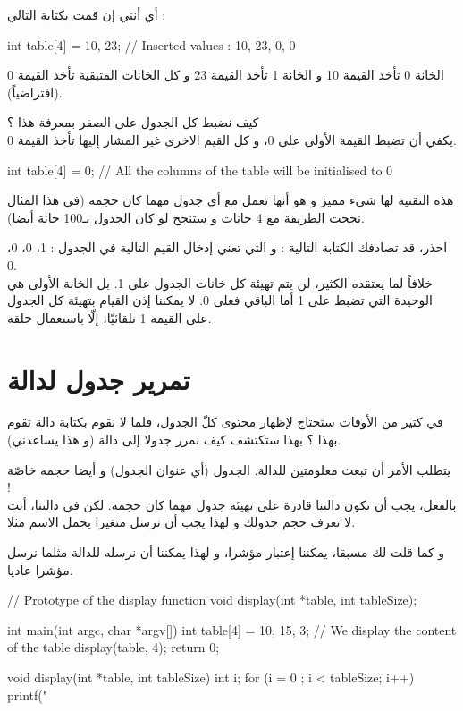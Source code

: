 أي أنني إن قمت بكتابة التالي :

\begin{Csource}
int table[4] = {10, 23}; // Inserted values : 10, 23, 0, 0
\end{Csource}

الخانة 0 تأخذ القيمة 10 و الخانة 1 تأخذ القيمة 23 و كل الخانات المتبقية تأخذ القيمة 0 (افتراضياً).

كيف نضبط كل الجدول على الصفر بمعرفة هذا ؟\\
يكفي أن تضبط القيمة الأولى على 0، و كل القيم الاخرى غير المشار إليها تأخذ القيمة 0.

\begin{Csource}
int table[4] = {0}; // All the columns of the table will be initialised to 0
\end{Csource}

هذه التقنية لها شيء مميز و هو أنها تعمل مع أي جدول مهما كان حجمه (في هذا المثال نجحت الطريقة مع 4 خانات و ستنجح لو كان الجدول بـ100 خانة أيضا).

\begin{critical}
احذر، قد تصادفك الكتابة التالية :
و التي تعني إدخال القيم التالية في الجدول :
1، 0، 0، 0.\\
خلافاً لما يعتقده الكثير، لن يتم تهيئة كل خانات الجدول على 1. بل الخانة الأولى هي الوحيدة التي تضبط على 1 أما الباقي فعلى 0. لا يمكننا إذن القيام بتهيئة كل الجدول على القيمة 1 تلقائيّا، إلّا باستعمال حلقة.
\end{critical}

\section{تمرير جدول لدالة}

في كثير من الأوقات ستحتاج لإظهار محتوى كلّ الجدول، فلما لا نقوم بكتابة دالة تقوم بهذا ؟ بهذا ستكتشف كيف نمرر جدولا إلى دالة (و هذا يساعدني).

يتطلب الأمر أن تبعث معلومتين للدالة. الجدول (أي عنوان الجدول) و أيضا حجمه خاصّة !\\
بالفعل، يجب أن تكون دالتنا قادرة على تهيئة جدول مهما كان حجمه. لكن في دالتنا، أنت لا تعرف حجم جدولك و لهذا يجب أن ترسل متغيرا يحمل الاسم
مثلا.

و كما قلت لك مسبقا، يمكننا إعتبار
مؤشرا، و لهذا يمكننا أن نرسله للدالة مثلما نرسل مؤشرا عاديا.

\begin{Csource}
// Prototype of the display function
void display(int *table, int tableSize);

int main(int argc, char *argv[])
{
	int table[4] = {10, 15, 3};
 	// We display the content of the table
	display(table, 4);
	return 0;
}

void display(int *table, int tableSize)
{
	int i;
	for (i = 0 ; i < tableSize; i++)
	{
    		printf("%
	}
}
\end{Csource}

